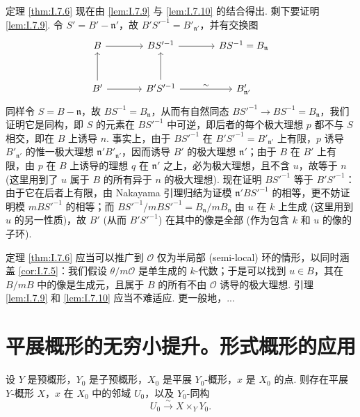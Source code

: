 定理 \ref{thm:I.7.6} 现在由 \ref{lem:I.7.9} 与 \ref{lem:I.7.10} 的结合得出. 剩下要证明 \ref{lem:I.7.9}. 令 $S' = B' - \mathfrak{n}'$，故 $B'S'^{-1} = B'_{\mathfrak{n}'}$，并有交换图
\[
\begin{tikzcd}[row sep=large, column sep=large]
B \arrow[r] & BS'^{-1} \arrow[r] & BS^{-1} = B_{\mathfrak{n}} \\
B' \arrow[u] \arrow[r] & B'S'^{-1} \arrow[u] \arrow[r,"\sim"] & B'_{\mathfrak{n}'}
\end{tikzcd}
\]
同样令 $S = B - \mathfrak{n}$，故 $BS^{-1} = B_{\mathfrak{n}}$，从而有自然同态 $BS'^{-1} \to BS^{-1} = B_{\mathfrak{n}}$，我们证明它是同构，即 $S$ 的元素在 $BS'^{-1}$ 中可逆，即后者的每个极大理想 $p$ 都不与 $S$ 相交，即在 $B$ 上诱导 $n$. 事实上，由于 $BS'^{-1}$ 在 $B'S'^{-1} = B'_{\mathfrak{n}'}$ 上有限，$p$ 诱导 $B'_{\mathfrak{n}'}$ 的惟一极大理想 $\mathfrak{n}'B'_{\mathfrak{n}'}$，因而诱导 $B'$ 的极大理想 $\mathfrak{n}'$；由于 $B$ 在 $B'$ 上有限，由 $p$ 在 $B$ 上诱导的理想 $q$ 在 $\mathfrak{n}'$ 之上，必为极大理想，且不含 $u$，故等于 $n$ (这里用到了 $u$ 属于 $B$ 的所有异于 $n$ 的极大理想). 现在证明 $BS'^{-1}$ 等于 $B'S'^{-1}$：由于它在后者上有限，由 Nakayama 引理归结为证模 $\mathfrak{n}'BS'^{-1}$ 的相等，更不妨证明模 $mBS'^{-1}$ 的相等；而 $BS'^{-1}/mBS'^{-1} = B_{\mathfrak{n}}/mB_{\mathfrak{n}}$ 由 $u$ 在 $k$ 上生成 (这里用到 $u$ 的另一性质)，故 $B'$ (从而 $B'S'^{-1}$) 在其中的像是全部 (作为包含 $k$ 和 $u$ 的像的子环).

\begin{remarkstar}
定理 \ref{thm:I.7.6} 应当可以推广到 $\mathcal{O}$ 仅为半局部 (semi-local) 环的情形，以同时涵盖 \ref{cor:I.7.5}：我们假设 $\theta/m\mathcal{O}$ 是单生成的 $k$-代数；于是可以找到 $u \in B$，其在 $B/mB$ 中的像是生成元，且属于 $B$ 的所有不由 $\mathcal{O}$ 诱导的极大理想. 引理 \ref{lem:I.7.9} 和 \ref{lem:I.7.10} 应当不难适应. 更一般地，...
\end{remarkstar}

\section{平展概形的无穷小提升。形式概形的应用}

\begin{proposition}\label{prop:I.8.1}
设 $Y$ 是预概形，$Y_0$ 是子预概形，$X_0$ 是平展 $Y_0$-概形，$x$ 是 $X_0$ 的点. 则存在平展 $Y$-概形 $X$，$x$ 在 $X_0$ 中的邻域 $U_0$，以及 $Y_0$-同构
\[
U_0 \stackrel{\sim}{\longrightarrow} X \times_Y Y_0.
\]
\end{proposition}

